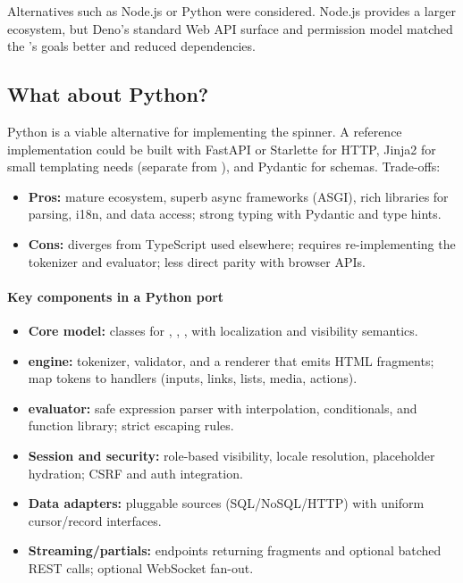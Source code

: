 Alternatives such as Node.js or Python were considered. Node.js provides a larger ecosystem, but Deno’s standard Web API surface and permission model matched the \webspinner’s goals better and reduced dependencies.

\subsection{What about Python?}
Python is a viable alternative for implementing the spinner. A reference implementation could be built with FastAPI or Starlette for HTTP, Jinja2 for small templating needs (separate from \wbll), and Pydantic for schemas. Trade-offs:
\begin{itemize}
	\item \textbf{Pros:} mature ecosystem, superb async frameworks (ASGI), rich libraries for parsing, i18n, and data access; strong typing with Pydantic and type hints.
	\item \textbf{Cons:} diverges from TypeScript used elsewhere; requires re-implementing the \wbll tokenizer and \wbpl evaluator; less direct parity with browser APIs.
\end{itemize}

\paragraph{Key components in a Python port}
\begin{itemize}
	\item \textbf{Core model:} classes for \stwsite, \stwarea, \stwpage, \stwcontent with localization and visibility semantics.
	\item \textbf{\wbll engine:} tokenizer, validator, and a renderer that emits HTML fragments; map tokens to handlers (inputs, links, lists, media, actions).
	\item \textbf{\wbpl evaluator:} safe expression parser with interpolation, conditionals, and function library; strict escaping rules.
	\item \textbf{Session and security:} role-based visibility, locale resolution, placeholder hydration; CSRF and auth integration.
	\item \textbf{Data adapters:} pluggable sources (SQL/NoSQL/HTTP) with uniform cursor/record interfaces.
	\item \textbf{Streaming/partials:} endpoints returning fragments and optional batched REST calls; optional WebSocket fan-out.
\end{itemize}

